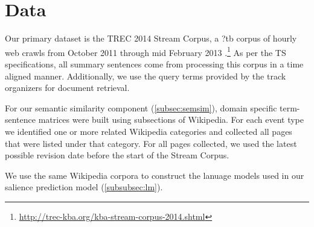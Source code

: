 \documentclass{sig-alternate}
\begin{document}


\section{Data}\label{sec:data}

Our primary dataset is the TREC 2014 Stream Corpus, a ?tb corpus of hourly 
web crawls from October 2011
through mid February 2013 \cite{frank2012building}.\footnote{\url{http://trec-kba.org/kba-stream-corpus-2014.shtml}}
As per the TS specifications, all summary sentences come from processing this
corpus in a time aligned manner. Additionally, we use the query terms 
provided by the track organizers for document retrieval.

For our semantic similarity component (\cref{subsec:semsim}),
domain specific term-sentence matrices were built using subsections of
Wikipedia. For each event type we identified one or more related Wikipedia
categories and collected all pages that were listed under that category.
For all pages collected, we used the latest possible revision date before the
start of the Stream Corpus.

We use the same Wikipedia corpora to construct the lanuage models used
in our salience prediction model (\cref{subsubsec:lm}). 
\end{document}
